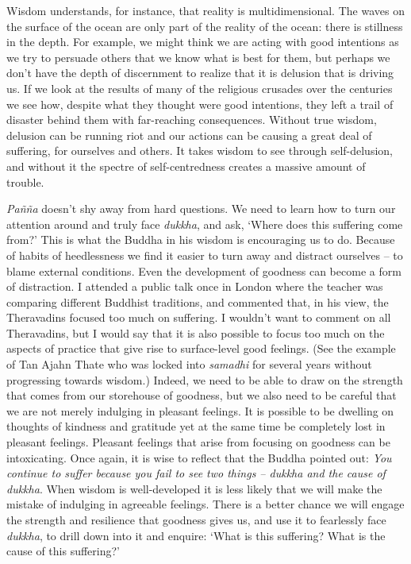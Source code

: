 Wisdom understands, for instance, that reality is multidimensional. The
waves on the surface of the ocean are only part of the reality of the
ocean: there is stillness in the depth. For example, we might think we
are acting with good intentions as we try to persuade others that we
know what is best for them, but perhaps we don't have the depth of
discernment to realize that it is delusion that is driving us. If we
look at the results of many of the religious crusades over the centuries
we see how, despite what they thought were good intentions, they left a
trail of disaster behind them with far-reaching consequences. Without
true wisdom, delusion can be running riot and our actions can be causing
a great deal of suffering, for ourselves and others. It takes wisdom to
see through self-delusion, and without it the spectre of
self-centredness creates a massive amount of trouble.

\emph{Pañña} doesn't shy away from hard questions. We need to learn how to
turn our attention around and truly face \emph{dukkha}, and ask, `Where does
this suffering come from?' This is what the Buddha in his wisdom is
encouraging us to do. Because of habits of heedlessness we find it
easier to turn away and distract ourselves -- to blame external
conditions. Even the development of goodness can become a form of
distraction. I attended a public talk once in London where the teacher
was comparing different Buddhist traditions, and commented that, in his
view, the Theravadins focused too much on suffering. I wouldn't want to
comment on all Theravadins, but I would say that it is also possible to
focus too much on the aspects of practice that give rise to
surface-level good feelings. (See the example of Tan Ajahn Thate who was
locked into \emph{samadhi} for several years without progressing towards
wisdom.) Indeed, we need to be able to draw on the strength that comes
from our storehouse of goodness, but we also need to be careful that we
are not merely indulging in pleasant feelings. It is possible to be
dwelling on thoughts of kindness and gratitude yet at the same time be
completely lost in pleasant feelings. Pleasant feelings that arise from
focusing on goodness can be intoxicating. Once again, it is wise to
reflect that the Buddha pointed out: \emph{You continue to suffer because you
fail to see two things -- dukkha and the cause of
dukkha}. When wisdom is well-developed it is less likely that we will
make the mistake of indulging in agreeable feelings. There is a better
chance we will engage the strength and resilience that goodness gives
us, and use it to fearlessly face \emph{dukkha}, to drill down into it and
enquire: `What is this suffering? What is the cause of this
suffering?'

